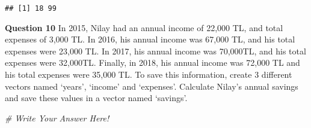 \documentclass[
]{article}
\newenvironment{Shaded}{\begin{snugshade}}{\end{snugshade}}
\newcommand{\CommentTok}[1]{\textcolor[rgb]{0.56,0.35,0.01}{\textit{#1}}}
\begin{document}
\begin{verbatim}
## [1] 18 99
\end{verbatim}

\textbf{Question 10} In 2015, Nilay had an annual income of 22,000 TL,
and total expenses of 3,000 TL. In 2016, his annual income was 67,000
TL, and his total expenses were 23,000 TL. In 2017, his annual income
was 70,000TL, and his total expenses were 32,000TL. Finally, in 2018,
his annual income was 72,000 TL and his total expenses were 35,000 TL.
To save this information, create 3 different vectors named `years',
`income' and `expenses'. Calculate Nilay's annual savings and save these
values in a vector named `savings'.

\begin{Shaded}
\begin{Highlighting}[]
\CommentTok{\# Write Your Answer Here!}
\end{Highlighting}
\end{Shaded}
\end{document}

